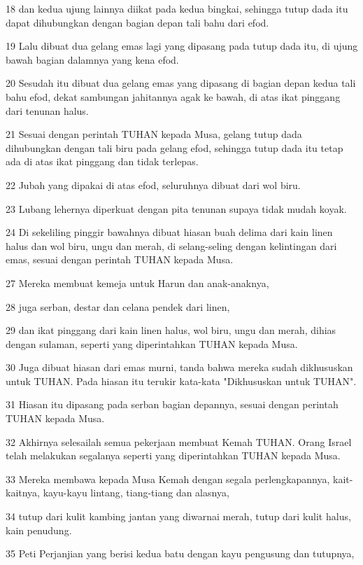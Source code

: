 \par 18 dan kedua ujung lainnya diikat pada kedua bingkai, sehingga tutup dada itu dapat dihubungkan dengan bagian depan tali bahu dari efod.
\par 19 Lalu dibuat dua gelang emas lagi yang dipasang pada tutup dada itu, di ujung bawah bagian dalamnya yang kena efod.
\par 20 Sesudah itu dibuat dua gelang emas yang dipasang di bagian depan kedua tali bahu efod, dekat sambungan jahitannya agak ke bawah, di atas ikat pinggang dari tenunan halus.
\par 21 Sesuai dengan perintah TUHAN kepada Musa, gelang tutup dada dihubungkan dengan tali biru pada gelang efod, sehingga tutup dada itu tetap ada di atas ikat pinggang dan tidak terlepas.
\par 22 Jubah yang dipakai di atas efod, seluruhnya dibuat dari wol biru.
\par 23 Lubang lehernya diperkuat dengan pita tenunan supaya tidak mudah koyak.
\par 24 Di sekeliling pinggir bawahnya dibuat hiasan buah delima dari kain linen halus dan wol biru, ungu dan merah, di selang-seling dengan kelintingan dari emas, sesuai dengan perintah TUHAN kepada Musa.
\par 27 Mereka membuat kemeja untuk Harun dan anak-anaknya,
\par 28 juga serban, destar dan celana pendek dari linen,
\par 29 dan ikat pinggang dari kain linen halus, wol biru, ungu dan merah, dihias dengan sulaman, seperti yang diperintahkan TUHAN kepada Musa.
\par 30 Juga dibuat hiasan dari emas murni, tanda bahwa mereka sudah dikhususkan untuk TUHAN. Pada hiasan itu terukir kata-kata "Dikhususkan untuk TUHAN".
\par 31 Hiasan itu dipasang pada serban bagian depannya, sesuai dengan perintah TUHAN kepada Musa.
\par 32 Akhirnya selesailah semua pekerjaan membuat Kemah TUHAN. Orang Israel telah melakukan segalanya seperti yang diperintahkan TUHAN kepada Musa.
\par 33 Mereka membawa kepada Musa Kemah dengan segala perlengkapannya, kait-kaitnya, kayu-kayu lintang, tiang-tiang dan alasnya,
\par 34 tutup dari kulit kambing jantan yang diwarnai merah, tutup dari kulit halus, kain penudung.
\par 35 Peti Perjanjian yang berisi kedua batu dengan kayu pengusung dan tutupnya,

